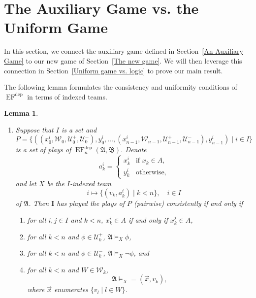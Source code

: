 \documentclass[10pt,a4paper]{amsart}
\newtheorem{lemma}[definition]{Lemma}
\newcommand{\playerone}{\mathrm{\mathbf{I}}}
\DeclareMathOperator{\EF}{EF}
\newcommand{\EFdep}{\EF^{\mathrm{dep}}}
\newcommand{\W}{\mathcal W}
\newcommand{\U}{\mathcal U}
\newcommand{\A}{\mathfrak{A}}
\newcommand{\B}{\mathfrak{B}}
\newcommand{\dep}{\mathop{=}}
\begin{document}
\section{The Auxiliary Game vs. the Uniform Game}\label{Auxiliary game vs. uniform game}

In this section, we connect the auxiliary game defined in Section~\ref{An Auxiliary Game} to our new game of Section~\ref{The new game}. We will then leverage this connection in Section~\ref{Uniform game vs. logic} to prove our main result.

The following lemma formulates the consistency and uniformity conditions of $\EFdep$ in terms of indexed teams.

\begin{lemma}\label{lemma: characterisation of the uniform game}\quad
    \begin{enumerate}
        \item Suppose that $I$ is a set and
        \[
            P = \{ ((x_0^i,\W_0,\U^+_0,\U^-_0),y_0^i,\dots,(x_{n-1}^i,\W_{n-1},\U^+_{n-1},\U^-_{n-1}),y_{n-1}^i) \mid i\in I \}
        \]
        is a set of plays of $\EFdep_n(\A,\B)$. Denote
        \[
            a_k^i =
            \begin{cases}
                x_k^i & \text{if $x_k\in A$}, \\
                y_k^i & \text{otherwise},
            \end{cases}
        \]
        and let $X$ be the $I$-indexed team
        \[
            i\mapsto\{(v_k,a^i_k) \mid k<n\}, \quad i\in I
        \]        
        of $\A$. Then $\playerone$ has played the plays of $P$ (pairwise) consistently if and only if
        \begin{enumerate}
            \item for all $i,j\in I$ and $k<n$, $x_k^i\in A$ if and only if $x_k^j\in A$,
            \item for all $k<n$ and $\phi\in\U^+_k$, $\A\models_X\phi$,
            \item for all $k<n$ and $\phi\in\U^-_k$, $\A\models_X\neg\phi$,
            and
            \item for all $k<n$ and $W\in\W_k$,
            \[
                \A\models_X\dep(\vec x, v_k),
            \]
            where $\vec x$ enumerates $\{v_l \mid l\in W\}$.
        \end{enumerate}


\end{enumerate}
\end{lemma}
\end{document}
